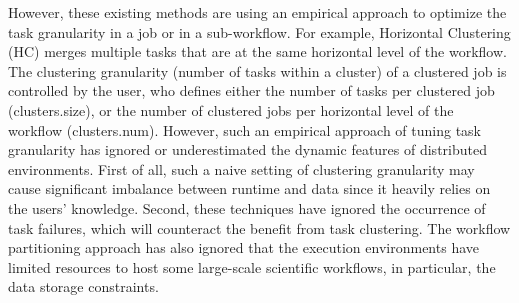 However, these existing methods are using an empirical approach to optimize the task granularity in a job or in a sub-workflow. For example, Horizontal Clustering (HC) \cite{Singh2008} merges multiple tasks that are at the same horizontal level of the workflow. The clustering granularity (number of tasks within a cluster) of a clustered job is controlled by the user, who defines either the number of tasks per clustered job (clusters.size), or the number of clustered jobs per horizontal level of the workflow (clusters.num). However, such an empirical approach of tuning task granularity has ignored or underestimated the dynamic features of distributed environments. First of all,  such a naive setting of clustering granularity may cause significant imbalance between runtime and data since it heavily relies on the users' knowledge. Second, these techniques have ignored the occurrence of task failures, which will counteract the benefit from task clustering. The workflow partitioning approach \cite{Rynge2012} has also ignored that the execution environments have limited resources to host some large-scale scientific workflows, in particular, the data storage constraints.




